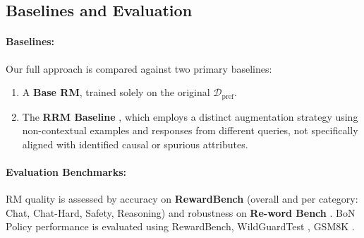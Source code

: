 \subsection{Baselines and Evaluation}
\label{app:baselines_ablations_eval_details}

\paragraph{Baselines:} Our full \carma{} approach is compared against two primary baselines:
\begin{enumerate}[itemsep=0pt, topsep=1pt, partopsep=0pt, leftmargin=*]
    \item A \textbf{Base RM}, trained solely on the original $\mathcal{D}_{\text{pref}}$.
    \item The \textbf{RRM Baseline} \citep{liu2024rrm}, which employs a distinct augmentation strategy using non-contextual examples and responses from different queries, not specifically aligned with identified causal or spurious attributes.
\end{enumerate}

\paragraph{Evaluation Benchmarks:}
RM quality is assessed by accuracy on \textbf{RewardBench} \citep{lambert2024rewardbench} (overall and per category: Chat, Chat-Hard, Safety, Reasoning) and robustness on \textbf{Re-word Bench} \citep{wu2025rewordbench}. BoN Policy performance is evaluated using RewardBench, WildGuardTest \citep{wildguard2024}, GSM8K \citep{cobbe2021gsm8k}.

